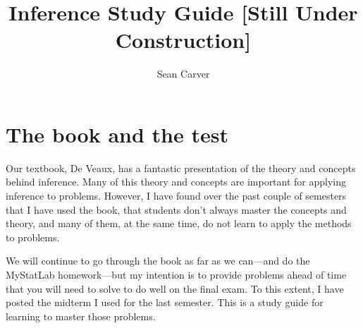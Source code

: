 \documentclass{article}
\title{Inference Study Guide [Still Under Construction]}
\author{Sean Carver}
\begin{document}
\maketitle
\section{The book and the test}
Our textbook, De Veaux, has a fantastic presentation of the theory and
concepts behind inference.  Many of this theory and concepts are
important for applying inference to problems.  However, I have found
over the past couple of semesters that I have used the book, that
students don't always master the concepts and theory, and many of
them, at the same time, do not learn to apply the methods to problems.

We will continue to go through the book as far as we can---and do the
MyStatLab homework---but my intention is to provide problems ahead of
time that you will need to solve to do well on the final exam.  To
this extent, I have posted the midterm I used for the last semester.
This is a study guide for learning to master those problems.
\end{document}
